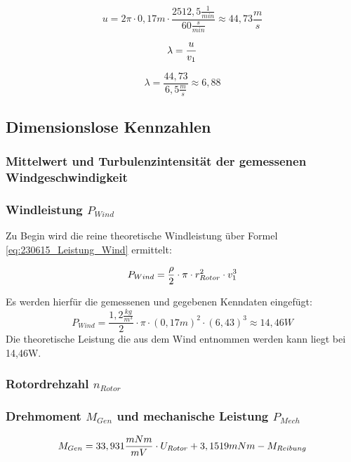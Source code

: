 $$    u = 2 \pi \cdot 0,17m \cdot \frac{2512,5 \frac{1}{min}}{60 \frac{s}{min}}\approx 44,73\frac{m}{s} $$

\begin{equation}
    \centering
    \lambda = \frac{u}{v_1}
    \label{eq:230615_Schnelllaufzahl}
\end{equation}

$$\lambda = \frac{44,73}{6,5 \frac{m}{s}}\approx 6,88$$


\subsection{Dimensionslose Kennzahlen}
\subsubsection*{Mittelwert und Turbulenzintensität der gemessenen Windgeschwindigkeit}
\subsubsection*{Windleistung $P_{Wind}$}
Zu Begin wird die reine theoretische Windleistung über Formel \autoref{eq:230615_Leistung_Wind} ermittelt:

\begin{equation}
    \centering
    P_{Wind} = \frac{\rho}{2} \cdot \pi \cdot r_{Rotor}^2 \cdot v_1^3
    \label{eq:230615_Leistung_Wind}
\end{equation}

Es werden hierfür die gemessenen und gegebenen Kenndaten eingefügt:
$$P_{Wind} = \frac{1,2 \frac{kg}{m^3}}{2} \cdot \pi \cdot (0,17 m)^2 \cdot (6,43)^3 \approx 14,46 W$$
Die theoretische Leistung die aus dem Wind entnommen werden kann liegt bei 14,46W.

\subsubsection*{Rotordrehzahl $n_{Rotor}$}

\subsubsection*{Drehmoment $M_{Gen}$ und mechanische Leistung $P_{Mech}$}
\begin{equation}
    \centering
    M_{Gen} = 33,931\frac{mNm}{mV} \cdot U_{Rotor} + 3,1519 mNm - M_{Reibung}
    \label{eq:230615_Genratormoment}
\end{equation}

